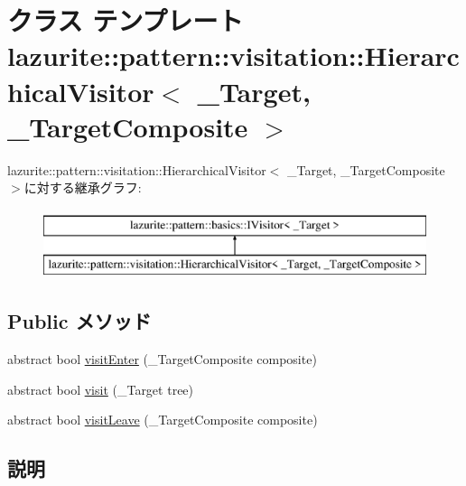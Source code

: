 \hypertarget{classlazurite_1_1pattern_1_1visitation_1_1_hierarchical_visitor_3_01___target_00_01___target_composite_01_4}{
\section{クラス テンプレート lazurite::pattern::visitation::HierarchicalVisitor$<$ \_\-Target, \_\-TargetComposite $>$}
\label{classlazurite_1_1pattern_1_1visitation_1_1_hierarchical_visitor_3_01___target_00_01___target_composite_01_4}
}
lazurite::pattern::visitation::HierarchicalVisitor$<$ \_\-Target, \_\-TargetComposite $>$に対する継承グラフ:\begin{figure}[H]
\begin{center}
\leavevmode
\includegraphics[height=2cm]{classlazurite_1_1pattern_1_1visitation_1_1_hierarchical_visitor_3_01___target_00_01___target_composite_01_4}
\end{center}
\end{figure}
\subsection*{Public メソッド}
\begin{DoxyCompactItemize}
\item 
abstract bool \hyperlink{classlazurite_1_1pattern_1_1visitation_1_1_hierarchical_visitor_3_01___target_00_01___target_composite_01_4_a211d04d195ed318bfb2d28bea6c6b409}{visitEnter} (\_\-TargetComposite composite)
\item 
abstract bool \hyperlink{classlazurite_1_1pattern_1_1visitation_1_1_hierarchical_visitor_3_01___target_00_01___target_composite_01_4_a34aa080c5269d28a0f8f0a14ff40c1db}{visit} (\_\-Target tree)
\item 
abstract bool \hyperlink{classlazurite_1_1pattern_1_1visitation_1_1_hierarchical_visitor_3_01___target_00_01___target_composite_01_4_a454772e007240833e80ea44fb2125350}{visitLeave} (\_\-TargetComposite composite)
\end{DoxyCompactItemize}


\subsection{説明}
